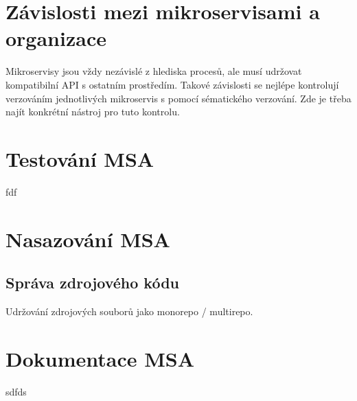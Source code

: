\section{Závislosti mezi mikroservisami a organizace}

Mikroservisy jsou vždy nezávislé z hlediska procesů, ale musí udržovat kompatibilní \gls{API} s ostatním prostředím.
Takové závislosti se nejlépe kontrolují verzováním jednotlivých mikroservis s pomocí sématického verzování.
Zde je třeba najít konkrétní nástroj pro tuto kontrolu.


\section{Testování \gls{MSA}}

fdf

\section{Nasazování \gls{MSA}}

\subsection{Správa zdrojového kódu}
Udržování zdrojových souborů jako monorepo / multirepo.

\section{Dokumentace \gls{MSA}}

sdfds
